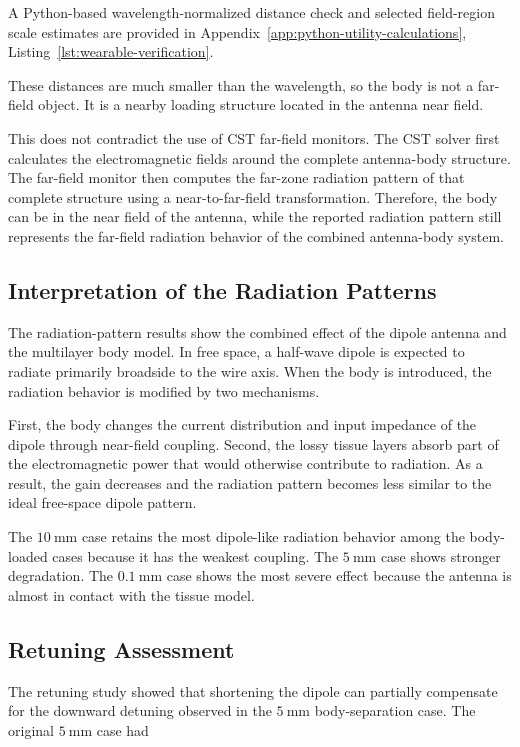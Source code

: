 A Python-based wavelength-normalized distance check and selected field-region scale estimates are provided in Appendix~\ref{app:python-utility-calculations}, Listing~\ref{lst:wearable-verification}.

These distances are much smaller than the wavelength, so the body is not a far-field object. It is a nearby loading structure located in the antenna near field.

This does not contradict the use of CST far-field monitors. The CST solver first calculates the electromagnetic fields around the complete antenna-body structure. The far-field monitor then computes the far-zone radiation pattern of that complete structure using a near-to-far-field transformation. Therefore, the body can be in the near field of the antenna, while the reported radiation pattern still represents the far-field radiation behavior of the combined antenna-body system.

\subsection{Interpretation of the Radiation Patterns}

The radiation-pattern results show the combined effect of the dipole antenna and the multilayer body model. In free space, a half-wave dipole is expected to radiate primarily broadside to the wire axis. When the body is introduced, the radiation behavior is modified by two mechanisms.

First, the body changes the current distribution and input impedance of the dipole through near-field coupling. Second, the lossy tissue layers absorb part of the electromagnetic power that would otherwise contribute to radiation. As a result, the gain decreases and the radiation pattern becomes less similar to the ideal free-space dipole pattern.

The \(10~\mathrm{mm}\) case retains the most dipole-like radiation behavior among the body-loaded cases because it has the weakest coupling. The \(5~\mathrm{mm}\) case shows stronger degradation. The \(0.1~\mathrm{mm}\) case shows the most severe effect because the antenna is almost in contact with the tissue model.

\subsection{Retuning Assessment}

The retuning study showed that shortening the dipole can partially compensate for the downward detuning observed in the \(5~\mathrm{mm}\) body-separation case. The original \(5~\mathrm{mm}\) case had


